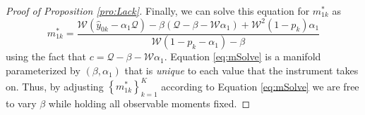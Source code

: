\begin{proof}[Proof of Proposition \ref{pro:Lack}]
Finally, we can solve this equation for $m^*_{1k}$ as
\begin{equation}
  m^*_{1k} = \frac{\mathcal{W}(\hat{y}_{0k}-\alpha_1 \mathcal{Q}) - \beta(\mathcal{Q}-\beta-\mathcal{W}\alpha_1) + \mathcal{W}^2(1-p_k)\alpha_1}{\mathcal{W}(1-p_k - \alpha_1) - \beta}
  \label{eq:mSolve}
\end{equation}
using the fact that $c = \mathcal{Q} - \beta - \mathcal{W}\alpha_1$.
Equation \ref{eq:mSolve} is a manifold parameterized by $(\beta,\alpha_1)$ that is \emph{unique} to each value that the instrument takes on. 
Thus, by adjusting $\left\{ m^*_{1k} \right\}_{k=1}^K$ according to Equation \ref{eq:mSolve} we are free to vary $\beta$ while holding all observable moments fixed. 
\end{proof}


